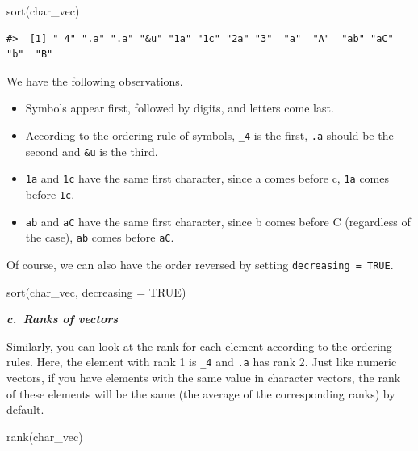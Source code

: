 \documentclass[
]{book}
\newenvironment{Shaded}{\begin{snugshade}}{\end{snugshade}}
\newcommand{\AttributeTok}[1]{\textcolor[rgb]{0.77,0.63,0.00}{#1}}
\newcommand{\ConstantTok}[1]{\textcolor[rgb]{0.00,0.00,0.00}{#1}}
\newcommand{\FunctionTok}[1]{\textcolor[rgb]{0.00,0.00,0.00}{#1}}
\newcommand{\NormalTok}[1]{#1}
\providecommand{\tightlist}{%
  \setlength{\itemsep}{0pt}\setlength{\parskip}{0pt}}
\begin{document}
\begin{Shaded}
\begin{Highlighting}[]
\FunctionTok{sort}\NormalTok{(char\_vec)}
\end{Highlighting}
\end{Shaded}

\begin{verbatim}
#>  [1] "_4" ".a" ".a" "&u" "1a" "1c" "2a" "3"  "a"  "A"  "ab" "aC" "b"  "B"
\end{verbatim}

We have the following observations.

\begin{itemize}
\tightlist
\item
  Symbols appear first, followed by digits, and letters come last.
\item
  According to the ordering rule of symbols, \texttt{\_4} is the first, \texttt{.a} should be the second and \texttt{\&u} is the third.
\item
  \texttt{1a} and \texttt{1c} have the same first character, since a comes before c, \texttt{1a} comes before \texttt{1c}.
\item
  \texttt{ab} and \texttt{aC} have the same first character, since b comes before C (regardless of the case), \texttt{ab} comes before \texttt{aC}.
\end{itemize}

Of course, we can also have the order reversed by setting \texttt{decreasing\ =\ TRUE}.

\begin{Shaded}
\begin{Highlighting}[]
\FunctionTok{sort}\NormalTok{(char\_vec, }\AttributeTok{decreasing =} \ConstantTok{TRUE}\NormalTok{)}
\end{Highlighting}
\end{Shaded}

\textbf{\emph{c.~Ranks of vectors}}

Similarly, you can look at the rank for each element according to the ordering rules. Here, the element with rank 1 is \texttt{\_4} and \texttt{.a} has rank 2. Just like numeric vectors, if you have elements with the same value in character vectors, the rank of these elements will be the same (the average of the corresponding ranks) by default.

\begin{Shaded}
\begin{Highlighting}[]
\FunctionTok{rank}\NormalTok{(char\_vec)}
\end{Highlighting}
\end{Shaded}
\end{document}
